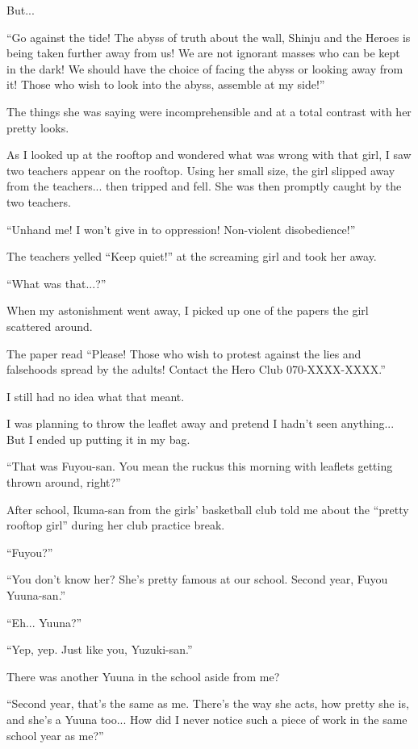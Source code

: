 But...

``Go against the tide! The abyss of truth about the wall, Shinju and the Heroes is being taken further away from us! We are not ignorant masses who can be kept in the dark! We should have the choice of facing the abyss or looking away from it! Those who wish to look into the abyss, assemble at my side!''

The things she was saying were incomprehensible and at a total contrast with her pretty looks.

As I looked up at the rooftop and wondered what was wrong with that girl, I saw two teachers appear on the rooftop. Using her small size, the girl slipped away from the teachers... then tripped and fell. She was then promptly caught by the two teachers.

``Unhand me! I won't give in to oppression! Non-violent disobedience!''

The teachers yelled ``Keep quiet!'' at the screaming girl and took her away.

``What was that...?''

When my astonishment went away, I picked up one of the papers the girl scattered around.

The paper read ``Please! Those who wish to protest against the lies and falsehoods spread by the adults! Contact the Hero Club \textrightarrow{} 070-XXXX-XXXX.''

I still had no idea what that meant.

I was planning to throw the leaflet away and pretend I hadn't seen anything... But I ended up putting it in my bag.

``That was Fuyou-san. You mean the ruckus this morning with leaflets getting thrown around, right?''

After school, Ikuma-san from the girls' basketball club told me about the ``pretty rooftop girl'' during her club practice break.

``Fuyou?''

``You don't know her? She's pretty famous at our school. Second year, Fuyou Yuuna-san.''

``Eh... Yuuna?''

``Yep, yep. Just like you, Yuzuki-san.''

There was another Yuuna in the school aside from me?

``Second year, that's the same as me. There's the way she acts, how pretty she is, and she's a Yuuna too... How did I never notice such a piece of work in the same school year as me?''

